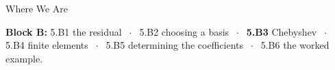 

\graphicspath{{./figures/}}





\makedecktitle

\begin{frame}{Where We Are}
\vspace{-1mm}
\begin{center}
\small \textbf{Block B:} 5.B1 the residual $\;\cdot\;$ 5.B2 choosing a basis $\;\cdot\;$ \textbf{5.B3} Chebyshev $\;\cdot\;$ 5.B4 finite elements $\;\cdot\;$ 5.B5 determining the coefficients $\;\cdot\;$ 5.B6 the worked example.
\end{center}
\end{frame}

